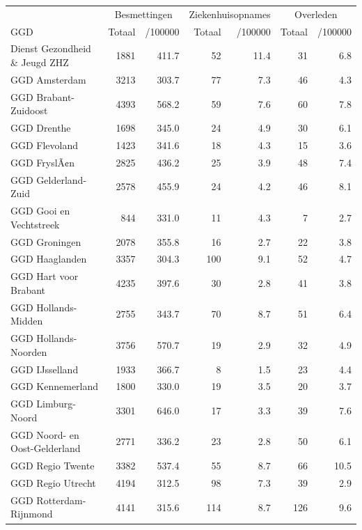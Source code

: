 \documentclass[
  english,
  man,floatsintext]{apa6}
\begin{document}
\begin{table}[H]
\centering\begingroup\fontsize{10}{12}\selectfont

\begin{threeparttable}
\begin{tabular}{lrrrrrr}
\toprule
\multicolumn{1}{c}{ } & \multicolumn{2}{c}{Besmettingen} & \multicolumn{2}{c}{Ziekenhuisopnames} & \multicolumn{2}{c}{Overleden} \\
\cmidrule(l{3pt}r{3pt}){2-3} \cmidrule(l{3pt}r{3pt}){4-5} \cmidrule(l{3pt}r{3pt}){6-7}
GGD & Totaal & /100000 & Totaal & /100000 & Totaal & /100000\\
\midrule
Dienst Gezondheid \& Jeugd ZHZ & 1881 & 411.7 & 52 & 11.4 & 31 & 6.8\\
GGD Amsterdam & 3213 & 303.7 & 77 & 7.3 & 46 & 4.3\\
GGD Brabant-Zuidoost & 4393 & 568.2 & 59 & 7.6 & 60 & 7.8\\
GGD Drenthe & 1698 & 345.0 & 24 & 4.9 & 30 & 6.1\\
GGD Flevoland & 1423 & 341.6 & 18 & 4.3 & 15 & 3.6\\
GGD FryslÃ¢n & 2825 & 436.2 & 25 & 3.9 & 48 & 7.4\\
GGD Gelderland-Zuid & 2578 & 455.9 & 24 & 4.2 & 46 & 8.1\\
GGD Gooi en Vechtstreek & 844 & 331.0 & 11 & 4.3 & 7 & 2.7\\
GGD Groningen & 2078 & 355.8 & 16 & 2.7 & 22 & 3.8\\
GGD Haaglanden & 3357 & 304.3 & 100 & 9.1 & 52 & 4.7\\
GGD Hart voor Brabant & 4235 & 397.6 & 30 & 2.8 & 41 & 3.8\\
GGD Hollands-Midden & 2755 & 343.7 & 70 & 8.7 & 51 & 6.4\\
GGD Hollands-Noorden & 3756 & 570.7 & 19 & 2.9 & 32 & 4.9\\
GGD IJsselland & 1933 & 366.7 & 8 & 1.5 & 23 & 4.4\\
GGD Kennemerland & 1800 & 330.0 & 19 & 3.5 & 20 & 3.7\\
GGD Limburg-Noord & 3301 & 646.0 & 17 & 3.3 & 39 & 7.6\\
GGD Noord- en Oost-Gelderland & 2771 & 336.2 & 23 & 2.8 & 50 & 6.1\\
GGD Regio Twente & 3382 & 537.4 & 55 & 8.7 & 66 & 10.5\\
GGD Regio Utrecht & 4194 & 312.5 & 98 & 7.3 & 39 & 2.9\\
GGD Rotterdam-Rijnmond & 4141 & 315.6 & 114 & 8.7 & 126 & 9.6\\

\end{tabular}
\end{threeparttable}
\end{table}
\end{document}
